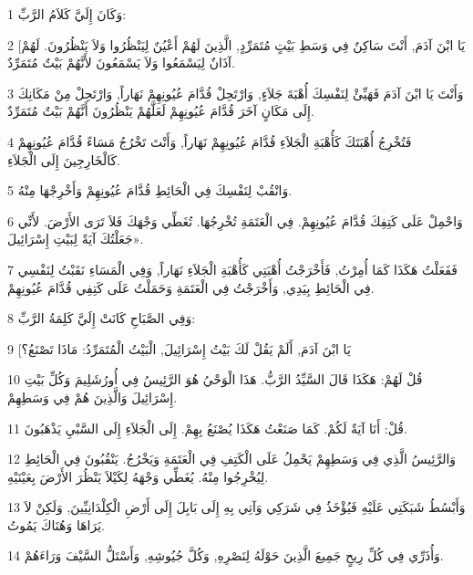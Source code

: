 \par 1 وَكَانَ إِلَيَّ كَلاَمُ الرَّبِّ:
\par 2 [يَا ابْنَ آدَمَ, أَنْتَ سَاكِنٌ فِي وَسَطِ بَيْتٍ مُتَمَرِّدٍ, الَّذِينَ لَهُمْ أَعْيُنٌ لِيَنْظُرُوا وَلاَ يَنْظُرُونَ. لَهُمْ آذَانٌ لِيَسْمَعُوا وَلاَ يَسْمَعُونَ لأَنَّهُمْ بَيْتٌ مُتَمَرِّدٌ.
\par 3 وَأَنْتَ يَا ابْنَ آدَمَ فَهَيِّئْ لِنَفْسِكَ أُهْبَةَ جَلاَءٍ, وَارْتَحِلْ قُدَّامَ عُيُونِهِمْ نَهَاراً, وَارْتَحِلْ مِنْ مَكَانِكَ إِلَى مَكَانٍ آخَرَ قُدَّامَ عُيُونِهِمْ لَعَلَّهُمْ يَنْظُرُونَ أَنَّهُمْ بَيْتٌ مُتَمَرِّدٌ.
\par 4 فَتُخْرِجُ أُهْبَتَكَ كَأُهْبَةِ الْجَلاَءِ قُدَّامَ عُيُونِهِمْ نَهَاراً, وَأَنْتَ تَخْرُجُ مَسَاءً قُدَّامَ عُيُونِهِمْ كَالْخَارِجِينَ إِلَى الْجَلاَءِ.
\par 5 وَانْقُبْ لِنَفْسِكَ فِي الْحَائِطِ قُدَّامَ عُيُونِهِمْ وَأَخْرِجْهَا مِنْهُ.
\par 6 وَاحْمِلْ عَلَى كَتِفِكَ قُدَّامَ عُيُونِهِمْ. فِي الْعَتَمَةِ تُخْرِجُهَا. تُغَطِّي وَجْهَكَ فَلاَ تَرَى الأَرْضَ. لأَنِّي جَعَلْتُكَ آيَةً لِبَيْتِ إِسْرَائِيلَ».
\par 7 فَفَعَلْتُ هَكَذَا كَمَا أُمِرْتُ, فَأَخْرَجْتُ أُهْبَتِي كَأُهْبَةِ الْجَلاَءِ نَهَاراً, وَفِي الْمَسَاءِ نَقَبْتُ لِنَفْسِي فِي الْحَائِطِ بِيَدِي, وَأَخْرَجْتُ فِي الْعَتَمَةِ وَحَمَلْتُ عَلَى كَتِفِي قُدَّامَ عُيُونِهِمْ.
\par 8 وَفِي الصَّبَاحِ كَانَتْ إِلَيَّ كَلِمَةُ الرَّبِّ:
\par 9 [يَا ابْنَ آدَمَ, أَلَمْ يَقُلْ لَكَ بَيْتُ إِسْرَائِيلَ, الْبَيْتُ الْمُتَمَرِّدُ: مَاذَا تَصْنَعُ؟
\par 10 قُلْ لَهُمْ: هَكَذَا قَالَ السَّيِّدُ الرَّبُّ. هَذَا الْوَحْيُ هُوَ الرَّئِيسُ فِي أُورُشَلِيمَ وَكُلِّ بَيْتِ إِسْرَائِيلَ وَالَّذِينَ هُمْ فِي وَسَطِهِمْ.
\par 11 قُلْ: أَنَا آيَةٌ لَكُمْ. كَمَا صَنَعْتُ هَكَذَا يُصْنَعُ بِهِمْ. إِلَى الْجَلاَءِ إِلَى السَّبْيِ يَذْهَبُونَ.
\par 12 وَالرَّئِيسُ الَّذِي فِي وَسَطِهِمْ يَحْمِلُ عَلَى الْكَتِفِ فِي الْعَتَمَةِ وَيَخْرُجُ. يَنْقُبُونَ فِي الْحَائِطِ لِيُخْرِجُوا مِنْهُ. يُغَطِّي وَجْهَهُ لِكَيْلاَ يَنْظُرَ الأَرْضَ بِعَيْنَيْهِ.
\par 13 وَأَبْسُطُ شَبَكَتِي عَلَيْهِ فَيُؤْخَذُ فِي شَرَكِي وَآتِي بِهِ إِلَى بَابِلَ إِلَى أَرْضِ الْكِلْدَانِيِّينَ, وَلَكِنْ لاَ يَرَاهَا وَهُنَاكَ يَمُوتُ.
\par 14 وَأُذَرِّي فِي كُلِّ رِيحٍ جَمِيعَ الَّذِينَ حَوْلَهُ لِنَصْرِهِ, وَكُلَّ جُيُوشِهِ, وَأَسْتَلُّ السَّيْفَ وَرَاءَهُمْ.
